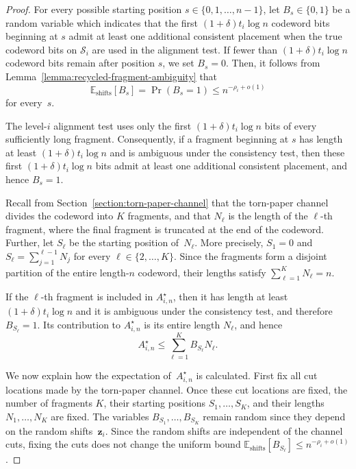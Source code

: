 \documentclass[journal,letterpaper,onecolumn,11pt]{IEEEtran}
\newcommand{\cS}{\mathcal{S}}
\newcommand{\boldz}{\mathbf{z}}
\begin{document}
\begin{proof}
For every possible starting position
\(s\in\{0,1,\ldots,n-1\}\), let \(B_s\in\{0,1\}\) be a random variable which indicates that the first
\((1+\delta)t_i\log n\) codeword bits beginning at \(s\) admit at least
one additional consistent placement when the true codeword bits on
\(\cS_i\) are used in the alignment test.  If fewer than
\((1+\delta)t_i\log n\) codeword bits remain after position \(s\), we set
\(B_s=0\).  
Then, it follows from Lemma~\ref{lemma:recycled-fragment-ambiguity} that
\[
\mathbb E_{\mathrm{shifts}}[B_s]
=
\Pr(B_s=1)
\leq
n^{-\rho_i+o(1)}
\]
for every~$s$.

The level-\(i\) alignment test uses only the first
\((1+\delta)t_i\log n\) bits of every sufficiently long fragment.
Consequently, if a fragment beginning at \(s\) has length at least
\((1+\delta)t_i\log n\) and is ambiguous under the consistency
test, then these first \((1+\delta)t_i\log n\) bits admit at least one
additional consistent placement, and hence \(B_s=1\).

Recall from Section~\ref{section:torn-paper-channel} that the torn-paper
channel divides the codeword into \(K\) fragments, and that \(N_\ell\) is the
length of the \(\ell\)-th fragment, where the final fragment is truncated
at the end of the codeword.
Further, let \(S_\ell\) be the starting position of~$N_\ell$.
More precisely, \(S_1=0\) and
\(S_\ell=\sum_{j=1}^{\ell-1}N_j\) for every
\(\ell\in\{2,\ldots,K\}\).
Since the fragments form a disjoint partition
of the entire length-\(n\) codeword, their lengths satisfy
$
\sum_{\ell=1}^{K}N_\ell=n.
$

If the \(\ell\)-th fragment is included in \(A_{i,n}^{\star}\), then it
has length at least \((1+\delta)t_i\log n\) and it is ambiguous under the
consistency test, and therefore \(B_{S_\ell}=1\).  Its contribution
to \(A_{i,n}^{\star}\) is its entire length \(N_\ell\), and hence
\[
A_{i,n}^{\star}
\leq
\sum_{\ell=1}^{K}B_{S_\ell}N_\ell.
\]

We now explain how the expectation of~$A_{i,n}^{\star}$ is calculated.  
First fix all cut locations made by the torn-paper channel.  Once these cut locations are fixed, the
number of fragments \(K\), their starting positions
\(S_1,\ldots,S_K\), and their lengths \(N_1,\ldots,N_K\) are fixed.
The variables \(B_{S_1},\ldots,B_{S_K}\) remain random since they depend
on the random shifts~$\boldz_i$.  Since the random shifts  are independent of the
channel cuts, fixing the cuts does not change the uniform bound
\(\mathbb E_{\mathrm{shifts}}[B_{S_\ell}]
\leq n^{-\rho_i+o(1)}\).


\end{proof}
\end{document}
